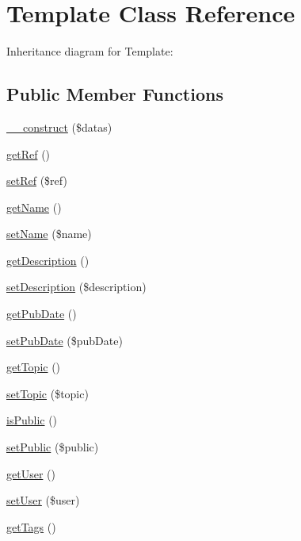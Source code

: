 \hypertarget{classTemplate}{}\section{Template Class Reference}
\label{classTemplate}


Inheritance diagram for Template\+:
\subsection*{Public Member Functions}
\begin{DoxyCompactItemize}
\item 
\hyperlink{classTemplate_a4150ce7e1cc4e8ef41e6dfb7a7182fa4}{\+\_\+\+\_\+construct} (\$datas)
\item 
\hyperlink{classTemplate_a1fdb7061dff51456ac03a6b8224d0e5f}{get\+Ref} ()
\item 
\hyperlink{classTemplate_adad317a29e4aba826dd15dcac0ec2ad5}{set\+Ref} (\$ref)
\item 
\hyperlink{classTemplate_abdbf91a0f8ccf03b212f8e31fa3fdeb5}{get\+Name} ()
\item 
\hyperlink{classTemplate_a5a321f8d11252c5b1a23d3e3ddde66e6}{set\+Name} (\$name)
\item 
\hyperlink{classTemplate_ad331444db21a9de12b1b722f51ea83c2}{get\+Description} ()
\item 
\hyperlink{classTemplate_ad37dd133737b316378f6ed9df5c5f79a}{set\+Description} (\$description)
\item 
\hyperlink{classTemplate_af108b77d2539d6a5836ba22d662048ed}{get\+Pub\+Date} ()
\item 
\hyperlink{classTemplate_a809420038abd5256b96bdb7c89b9f208}{set\+Pub\+Date} (\$pub\+Date)
\item 
\hyperlink{classTemplate_ac68df90a372cdbc75822229257218516}{get\+Topic} ()
\item 
\hyperlink{classTemplate_a4619c0ac8afd3e681ce63065541c81e5}{set\+Topic} (\$topic)
\item 
\hyperlink{classTemplate_a593d0d0291badc66fea914fbd9e2a9c9}{is\+Public} ()
\item 
\hyperlink{classTemplate_ab05e621ea17c7013579258d4350eaf01}{set\+Public} (\$public)
\item 
\hyperlink{classTemplate_af79ebfec04b99c7260cb867da880b6d8}{get\+User} ()
\item 
\hyperlink{classTemplate_a4ab4721cf69698c49dcb955ff8c7f429}{set\+User} (\$user)
\item 
\hyperlink{classTemplate_a1b12802a05fe6b9a1d81f27d2a25ad31}{get\+Tags} ()

\end{DoxyCompactItemize}

